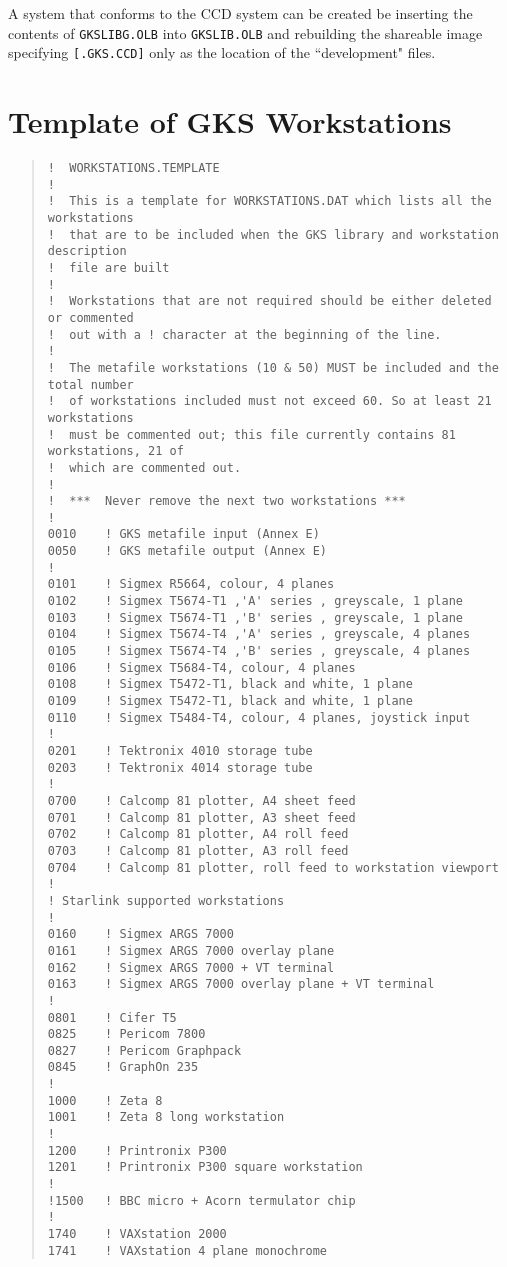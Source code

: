 A system that conforms to the CCD system can be created be inserting the
contents of {\tt GKSLIBG\-.OLB} into {\tt GKSLIB.OLB} and rebuilding the
shareable image specifying {\tt [.GKS.CCD]} only as the location of the
``development" files.

\newpage
\appendix
\section{Template of GKS Workstations}
\label{se:temp}
\begin{quote}\small
\begin{verbatim}
!  WORKSTATIONS.TEMPLATE
!
!  This is a template for WORKSTATIONS.DAT which lists all the workstations
!  that are to be included when the GKS library and workstation description
!  file are built
!
!  Workstations that are not required should be either deleted or commented
!  out with a ! character at the beginning of the line.
!
!  The metafile workstations (10 & 50) MUST be included and the total number
!  of workstations included must not exceed 60. So at least 21 workstations
!  must be commented out; this file currently contains 81 workstations, 21 of
!  which are commented out.
!
!  ***  Never remove the next two workstations ***
!
0010	! GKS metafile input (Annex E)
0050	! GKS metafile output (Annex E)
!
0101	! Sigmex R5664, colour, 4 planes
0102	! Sigmex T5674-T1 ,'A' series , greyscale, 1 plane
0103	! Sigmex T5674-T1 ,'B' series , greyscale, 1 plane
0104	! Sigmex T5674-T4 ,'A' series , greyscale, 4 planes
0105	! Sigmex T5674-T4 ,'B' series , greyscale, 4 planes
0106	! Sigmex T5684-T4, colour, 4 planes
0108	! Sigmex T5472-T1, black and white, 1 plane
0109	! Sigmex T5472-T1, black and white, 1 plane
0110	! Sigmex T5484-T4, colour, 4 planes, joystick input
!
0201	! Tektronix 4010 storage tube
0203	! Tektronix 4014 storage tube
!
0700	! Calcomp 81 plotter, A4 sheet feed
0701	! Calcomp 81 plotter, A3 sheet feed
0702	! Calcomp 81 plotter, A4 roll feed
0703	! Calcomp 81 plotter, A3 roll feed
0704	! Calcomp 81 plotter, roll feed to workstation viewport
! 
! Starlink supported workstations
!
0160	! Sigmex ARGS 7000
0161	! Sigmex ARGS 7000 overlay plane
0162	! Sigmex ARGS 7000 + VT terminal
0163	! Sigmex ARGS 7000 overlay plane + VT terminal
!
0801	! Cifer T5
0825	! Pericom 7800
0827	! Pericom Graphpack
0845	! GraphOn 235
!
1000	! Zeta 8
1001	! Zeta 8 long workstation
!
1200	! Printronix P300
1201	! Printronix P300 square workstation
!
!1500	! BBC micro + Acorn termulator chip
!
1740	! VAXstation 2000
1741	! VAXstation 4 plane monochrome

\end{verbatim}
\end{quote}
